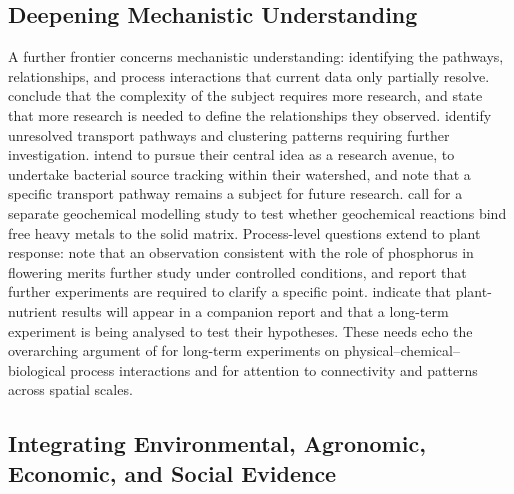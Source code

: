 \documentclass[11pt]{article}
\begin{document}
\subsection{Deepening Mechanistic Understanding}

A further frontier concerns mechanistic understanding: identifying the pathways, relationships, and process interactions that current data only partially resolve. \textcite{Malone2014} conclude that the complexity of the subject requires more research, and \textcite{Cui2016} state that more research is needed to define the relationships they observed. \textcite{Petersen2012} identify unresolved transport pathways and clustering patterns requiring further investigation. \textcite{Tomer2008} intend to pursue their central idea as a research avenue, to undertake bacterial source tracking within their watershed, and note that a specific transport pathway remains a subject for future research. \textcite{Ali2013} call for a separate geochemical modelling study to test whether geochemical reactions bind free heavy metals to the solid matrix. Process-level questions extend to plant response: \textcite{GiménezValero2025} note that an observation consistent with the role of phosphorus in flowering merits further study under controlled conditions, and \textcite{Tamura2021} report that further experiments are required to clarify a specific point. \textcite{LAL1993} indicate that plant-nutrient results will appear in a companion report and that a long-term experiment is being analysed to test their hypotheses. These needs echo the overarching argument of \textcite{Rogger2017} for long-term experiments on physical--chemical--biological process interactions and for attention to connectivity and patterns across spatial scales.

\subsection{Integrating Environmental, Agronomic, Economic, and Social Evidence}
\end{document}

